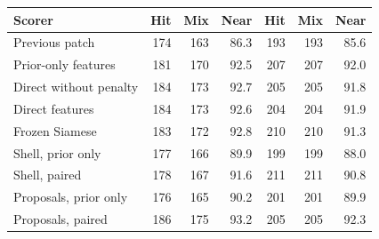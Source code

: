 \begin{tabular}{@{}lrrr@{\hspace{6pt}}rrr@{}}
\toprule
Scorer & Hit & Mix & Near & Hit & Mix & Near \\
\midrule
Previous patch & 174 & 163 & 86.3 & 193 & 193 & 85.6 \\
Prior-only features & 181 & 170 & 92.5 & 207 & 207 & 92.0 \\
Direct without penalty & 184 & 173 & 92.7 & 205 & 205 & 91.8 \\
Direct features & 184 & 173 & 92.6 & 204 & 204 & 91.9 \\
Frozen Siamese & 183 & 172 & 92.8 & 210 & 210 & 91.3 \\
Shell, prior only & 177 & 166 & 89.9 & 199 & 199 & 88.0 \\
Shell, paired & 178 & 167 & 91.6 & 211 & 211 & 90.8 \\
Proposals, prior only & 176 & 165 & 90.2 & 201 & 201 & 89.9 \\
Proposals, paired & 186 & 175 & 93.2 & 205 & 205 & 92.3 \\
\bottomrule
\end{tabular}
